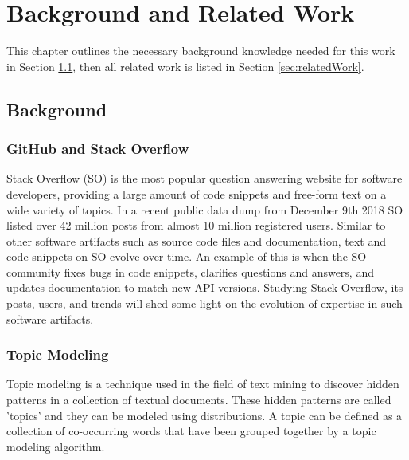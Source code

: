 \chapter{Background and Related Work\label{chap:relatedWork}}
    This chapter outlines the necessary background knowledge needed for this work in Section \ref{sec:background}, then all related work is listed in Section \ref{sec:relatedWork}.
    
\section{Background} \label{sec:background}

    
    \subsection{GitHub and Stack Overflow}
    
        Stack Overflow (SO) is the most popular question answering website for software developers, providing a large amount of code snippets and free-form text on a wide variety of topics. In a recent public data dump from December 9th 2018 SO listed over 42 million posts from almost 10 million registered users. Similar to other software artifacts such as source code files and documentation, text and code snippets on SO evolve over time. An example of this is when the SO community fixes bugs in code snippets, clarifies questions and answers, and updates documentation to match new API versions. Studying Stack Overflow, its posts, users, and trends will shed some light on the evolution of expertise in such software artifacts.
    
    \subsection{Topic Modeling}
        
        Topic modeling is a technique used in the field of text mining to discover hidden patterns in a collection of textual documents. These hidden patterns are called 'topics' and they can be modeled using distributions. A topic can be defined as a collection of co-occurring words that have been grouped together by a topic modeling algorithm.
        
